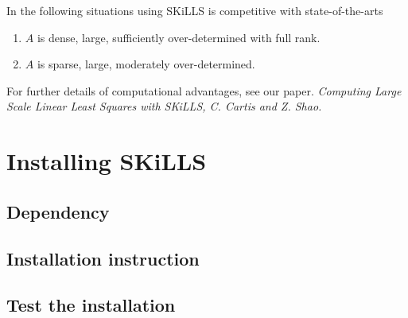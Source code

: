 \documentclass[english,11pt]{article}
\begin{document}
In the following situations using SKiLLS is competitive with state-of-the-arts

\begin{enumerate}
	\item $A$ is dense, large, sufficiently over-determined with full rank. 

	\item $A$ is sparse, large, moderately over-determined. 
\end{enumerate}





For further details of computational advantages, see our paper. \it{Computing Large Scale Linear Least Squares with SKiLLS, C. Cartis and Z. Shao}.

\section{Installing SKiLLS}
\subsection{Dependency}
\subsection{Installation instruction}
\subsection{Test the installation}
\end{document}
